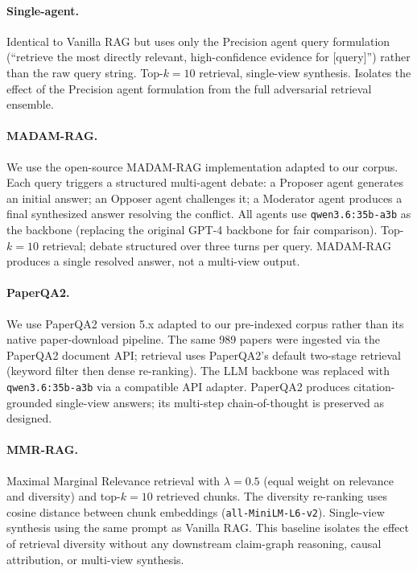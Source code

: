 \documentclass[11pt]{article}
\begin{document}
\paragraph{Single-agent.}
Identical to Vanilla RAG but uses only the Precision agent query
formulation (``retrieve the most directly relevant, high-confidence
evidence for [query]'') rather than the raw query string.  Top-$k{=}10$
retrieval, single-view synthesis.  Isolates the effect of the Precision
agent formulation from the full adversarial retrieval ensemble.

\paragraph{MADAM-RAG.}
We use the open-source MADAM-RAG implementation \citep{wang2025conflicting}
adapted to our corpus.  Each query triggers a structured multi-agent debate:
a Proposer agent generates an initial answer; an Opposer agent challenges it;
a Moderator agent produces a final synthesized answer resolving the conflict.
All agents use \texttt{qwen3.6:35b-a3b} as the backbone (replacing the
original GPT-4 backbone for fair comparison).  Top-$k{=}10$ retrieval;
debate structured over three turns per query.  MADAM-RAG produces a
single resolved answer, not a multi-view output.

\paragraph{PaperQA2.}
We use PaperQA2 version 5.x \citep{lala2023paperqa} adapted to our
pre-indexed corpus rather than its native paper-download pipeline.
The same 989 papers were ingested via the PaperQA2 document API;
retrieval uses PaperQA2's default two-stage retrieval (keyword filter
then dense re-ranking).  The LLM backbone was replaced with
\texttt{qwen3.6:35b-a3b} via a compatible API adapter.  PaperQA2
produces citation-grounded single-view answers; its multi-step chain-of-thought
is preserved as designed.

\paragraph{MMR-RAG.}
Maximal Marginal Relevance retrieval \citep{carbonell1998mmr} with
$\lambda{=}0.5$ (equal weight on relevance and diversity) and
top-$k{=}10$ retrieved chunks.  The diversity re-ranking uses cosine
distance between chunk embeddings (\texttt{all-MiniLM-L6-v2}).
Single-view synthesis using the same prompt as Vanilla RAG.
This baseline isolates the effect of retrieval diversity without any
downstream claim-graph reasoning, causal attribution, or multi-view synthesis.
\end{document}
